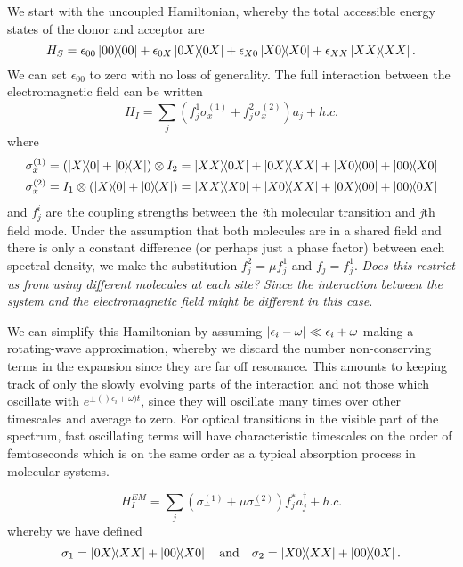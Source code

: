\documentclass[]{article}
\begin{document}
We start with the uncoupled Hamiltonian, whereby the total accessible energy states of the donor and acceptor are
\begin{equation}
H_S = \epsilon_{00}\dyad{00} + \epsilon_{0X}\dyad{0X} + \epsilon_{X0}\dyad{X0} + \epsilon_{XX}\dyad{XX}.
\end{equation}
We can set $\epsilon_{00}$ to zero with no loss of generality. The full interaction between the electromagnetic field can be written
\begin{equation}
H_I = \sum_{j}\left(f_j^1\sigma_x^{(1)} + f_j^2\sigma_x^{(2)}\right)a_j + h.c.
\end{equation}
where 
\begin{align}
\sigma_x^{(1)} &= (\dyad{X}{0} + \dyad{0}{X})\otimes I_2 = \dyad{XX}{0X} +  \dyad{0X}{XX} + \dyad{X0}{00} + \dyad{00}{X0} \\
\sigma_x^{(2)} &= I_1 \otimes (\dyad{X}{0} + \dyad{0}{X}) = \dyad{XX}{X0} +  \dyad{X0}{XX} + \dyad{0X}{00} + \dyad{00}{0X}
\end{align}
and $f_j^i$ are the coupling strengths between the \textit{i}th molecular transition and \textit{j}th field mode. Under the assumption that both molecules are in a shared field and there is only a constant difference (or perhaps just a phase factor) between each spectral density, we make the substitution $f_j^2 = \mu f_j^1$ and $f_j = f_j^1$. \textit{Does this restrict us from using different molecules at each site? Since the interaction between the system and the electromagnetic field might be different in this case.}

We can simplify this Hamiltonian by assuming $\abs{\epsilon_i-\omega}\ll \epsilon_i+\omega$ making a rotating-wave approximation, whereby we discard the number non-conserving terms in the expansion since they are far off resonance. This amounts to keeping track of only the slowly evolving parts of the interaction and not those which oscillate with $e^{\pm ()\epsilon_i+\omega)t}$, since they will oscillate many times over other timescales and average to zero. For optical transitions in the visible part of the spectrum, fast oscillating terms will have characteristic timescales on the order of femtoseconds which is on the same order as a typical absorption process in molecular systems. 

\begin{equation}
H_I^{EM} =\sum_{j} \left(\sigma_-^{(1)} + \mu\sigma_-^{(2)}\right) f_j^*a_j^{\dagger} + h.c.
\end{equation}
whereby we have defined
\begin{equation}
\sigma_1 = \dyad{0X}{XX} + \dyad{00}{X0} \quad \textmd{and}\quad \sigma_2 = \dyad{X0}{XX} + \dyad{00}{0X}.
\end{equation}
\end{document}
